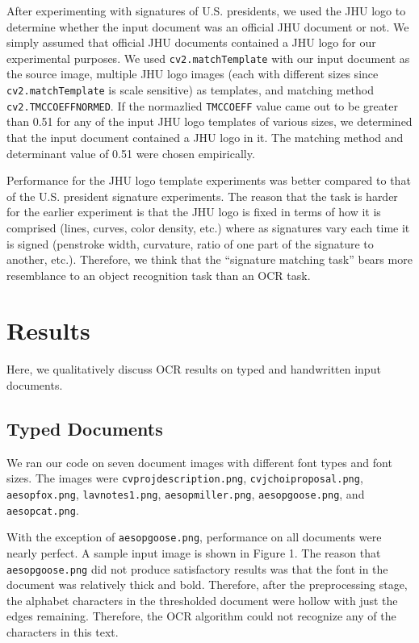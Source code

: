\documentclass[11pt,letterpaper]{article}
\begin{document}
After experimenting with signatures of U.S. presidents, we used the JHU logo to determine whether the input document was an official JHU document or not. We simply assumed that official JHU documents contained a JHU logo for our experimental purposes. We used {\tt cv2.matchTemplate} with our input document as the source image, multiple JHU logo images (each with different sizes since {\tt cv2.matchTemplate} is scale sensitive) as templates, and matching method {\tt cv2.TM\textunderscore CCOEFF\textunderscore NORMED}. If the normazlied {\tt TM\textunderscore CCOEFF} value came out to be greater than 0.51 for any of the input JHU logo templates of various sizes, we determined that the input document contained a JHU logo in it. The matching method and determinant value of 0.51 were chosen empirically.

Performance for the JHU logo template experiments was better compared to that of the U.S. president signature experiments. The reason that the task is harder for the earlier experiment is that the JHU logo is fixed in terms of how it is comprised (lines, curves, color density, etc.) where as signatures vary each time it is signed (penstroke width, curvature, ratio of one part of the signature to another, etc.). Therefore, we think that the ``signature matching task'' bears more resemblance to an object recognition task than an OCR task.

\section{Results}

Here, we qualitatively discuss OCR results on typed and handwritten input documents.

\subsection{Typed Documents}

We ran our code on seven document images with different font types and font sizes. The images were {\tt cv\textunderscore proj\textunderscore description.png}, {\tt cv\textunderscore jchoi\textunderscore proposal.png}, {\tt aesop\textunderscore fox.png}, {\tt lav\textunderscore notes1.png}, {\tt aesop\textunderscore miller.png}, {\tt aesop\textunderscore goose.png}, and {\tt aesop\textunderscore cat.png}.

With the exception of {\tt aesop\textunderscore goose.png}, performance on all documents were nearly perfect. A sample input image is shown in Figure 1. The reason that {\tt aesop\textunderscore goose.png} did not produce satisfactory results was that the font in the document was relatively thick and bold. Therefore, after the preprocessing stage, the alphabet characters in the thresholded document were hollow with just the edges remaining. Therefore, the OCR algorithm could not recognize any of the characters in this text.
\end{document}
